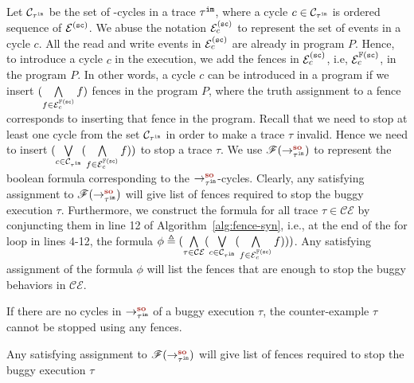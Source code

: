 Let $ \mathcal{C}_{{\tau}^{\mathtt{im}}} $ be the set of \lso-cycles in a trace $ {\tau}^{\mathtt{im}} $, 
where a cycle $ c \in \mathcal{C}_{{\tau}^{\mathtt{im}}} $ is ordered sequence of 
$ \mathcal{E}^{(\texttt{sc})} $. We abuse the notation $\mathcal{E}^{(\texttt{sc})}_c$ to 
represent the set of events in a cycle $ c $. 
All the read and write events in $\mathcal{E}^{(\texttt{sc})}_c$ are already in program $ P $. 
Hence, to introduce a cycle $ c $ in the execution, we add the fences in $\mathcal{E}^{(\texttt{sc})}_c$, i.e, 
$\mathcal{E}^{\mathbb{F}(\texttt{sc})}_c$, in the program $ P $.
In other words, a cycle $ c $ can be introduced in a program if we insert 
$ (\bigwedge\limits_{f \in \mathcal{E}^{\mathbb{F}(\texttt{sc})}_c} f)$ fences in the program $ P $, 
where the truth assignment to a fence corresponds to inserting that fence 
in the program.
Recall that we need to stop at least one cycle from the set 
$ \mathcal{C}_{{\tau}^{\mathtt{im}}} $ in order to make a trace $ \tau $ invalid.
Hence we need to insert $ (\bigvee\limits_{c \in \mathcal{C}_{{\tau}^{\mathtt{im}}}} (\bigwedge\limits_{f \in \mathcal{E}^{\mathbb{F}(\texttt{sc})}_c} f)) $ to stop a trace $ \tau $. 
We use $\formula{\so{\im{\tau}}{}{}}$ to represent the boolean formula 
corresponding to the $ \so{\im{\tau}}{}{} $-cycles.
Clearly, any satisfying assignment to $ \formula{\so{\im{\tau}}{}{}} $ 
will give list of fences required to stop the buggy execution $ \tau $.
%
Furthermore, we construct the formula for all trace 
$ \tau \in \mathcal{CE} $ by conjuncting them in 
line 12 of Algorithm~\ref{alg:fence-syn}, i.e., 
at the end of the for loop in lines 4-12, the formula 
$ \phi \triangleq (\bigwedge\limits_{\tau \in \mathcal{CE}} 
(\bigvee\limits_{c \in \mathcal{C}_{{\tau}^{\mathtt{im}}}} 
(\bigwedge\limits_{f \in \mathcal{E}^{\mathbb{F}(\texttt{sc})}_c} f))) $.
Any satisfying assignment of the formula $\phi$ will list the fences that 
are enough to stop the buggy behaviors in $ \mathcal{CE} $.


\begin{lemma}
	If there are no cycles in $\so{\im{\tau}}{}{}$ of a buggy execution 
	$\tau$, the counter-example $ \tau $ cannot be stopped using any \cc 
	fences.
\end{lemma}

\begin{theorem}
	Any satisfying assignment to $ \formula{\so{\im{\tau}}{}{}} $ 
	will give list of fences required to stop the buggy execution $ \tau $
\end{theorem}


